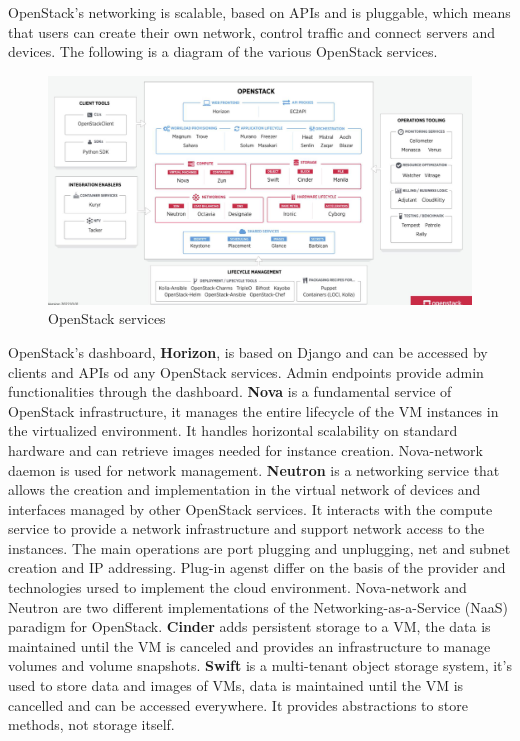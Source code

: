 OpenStack's networking is scalable, based on APIs and is pluggable, which means that users can create their own network, control traffic and connect servers and devices. \n
The following is a diagram of the various OpenStack services.
\begin{figure}
    \centering
    \includegraphics[scale=0.4]{Images/OpenStack_Services.png}
    \caption{OpenStack services}
\end{figure}
OpenStack's dashboard, \textbf{Horizon}, is based on Django and can be accessed by clients and APIs od any OpenStack services. Admin endpoints provide admin functionalities through the dashboard. \n
\textbf{Nova} is a fundamental service of OpenStack infrastructure, it manages the entire lifecycle of the VM instances in the virtualized environment. It handles horizontal scalability on standard hardware and can retrieve images needed for instance creation. Nova-network daemon is used for network management. \n
\textbf{Neutron} is a networking service that allows the creation and implementation in the virtual network of devices and interfaces managed by other OpenStack services. It interacts with the compute service to provide a network infrastructure and support network access to the instances. \n
The main operations are port plugging and unplugging, net and subnet creation and IP addressing. Plug-in agenst differ on the basis of the provider and technologies ursed to implement the cloud environment. Nova-network and Neutron are two different implementations of the Networking-as-a-Service (NaaS) paradigm for OpenStack. \n
\textbf{Cinder} adds persistent storage to a VM, the data is maintained until the VM is canceled and provides an infrastructure to manage volumes and volume snapshots. \n
\textbf{Swift} is a multi-tenant object storage system, it's used to store data and images of VMs, data is maintained until the VM is cancelled and can be accessed everywhere. It provides abstractions to store methods, not storage itself. \n
